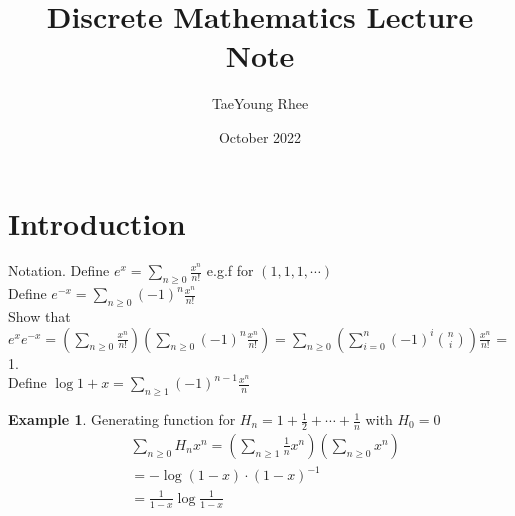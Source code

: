 \documentclass{article}
\title{Discrete Mathematics Lecture Note}
\author{TaeYoung Rhee}
\date{October 2022}
\theoremstyle{definition}
\newtheorem{ex}{Example}[]
\begin{document}
\maketitle

\section{Introduction}
Notation.
Define
$ e^x = \sum_{n\ge0} \frac{x^n}{n!}$ e.g.f for $(1,1,1, \cdots)$ \\ 
Define $e^{-x} = \sum_{n\ge0} (-1)^n \frac{x^n}{n!}$ \\ 
Show that $e^x e^{-x} = \left( \sum_{n\ge 0} \frac{x^n}{n!}\right)\left( \sum_{n\ge 0} (-1)^n  \frac{x^n}{n!}\right) = \sum_{n\ge 0} \left( \sum_{i=0}^n (-1)^i { n \choose i} \right) \frac{x^n}{n!}$ = 1. \\ 
Define $\log{1+x} = \sum_{n\ge 1} (-1)^{n-1} \frac{x^n}{n} $ \\ 
\begin{ex}
Generating function for $H_n = 1 + \frac{1}{2} + \cdots + \frac{1}{n}$ with $ H_0 = 0$ 
\begin{align*}
    &\sum_{n\ge 0} H_n x^n = \left( \sum_{n\ge 1} \frac{1}{n}x^n \right) \left( \sum_{n\ge 0 } x^n \right) \\
    & = -\log{(1-x)} \cdot (1-x)^{-1} \\ 
    & = \frac{1}{1-x}\log{\frac{1}{1-x}}
\end{align*}
\end{ex}
\end{document}
